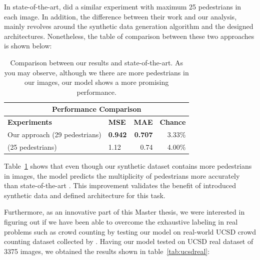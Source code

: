 \noindent In state-of-the-art, \citet{segui2015learning} did a similar experiment with maximum 25 pedestrians in each image. In addition, the difference between their work and our analysis, mainly revolves around the synthetic data generation algorithm and the designed architectures. Nonetheless, the table of comparison between these two approaches is shown below:
 
\begin{table}[H]
\centering
\small\sffamily
\begin{tabular}{llrr}
\multicolumn{4}{c}{\textbf{\textbf{Performance Comparison}}} \\
\bottomrule
\textbf{Experiments} &\textbf{MSE} &\textbf{MAE}& \textbf{Chance} \\
\bottomrule
Our approach (29 pedestrians)                  & \textbf{0.942}   &  \textbf{0.707}        & 3.33\% \\
\citet{segui2015learning} (25 pedestrians)     & 1.12       & 0.74     & 4.00\% \\
\bottomrule
\end{tabular}
\caption{Comparison between our results and state-of-the-art. As you may observe, although we there are more pedestrians in our images, our model shows a more promising performance.  }
\label{tab:tab}
\end{table} 

Table~\ref{tab:tab} shows that even though our synthetic dataset contains more pedestrians in images, the model predicts the multiplicity of pedestrians more accurately than state-of-the-art \cite{segui2015learning}. This improvement validates the benefit of introduced synthetic data and defined architecture for this task. 

\noindent Furthermore, as an innovative part of this Master thesis, we were interested in figuring out if we have been able to overcome the exhaustive labeling in real problems such as crowd counting by testing our model on real-world UCSD crowd counting dataset collected by \citet{chan2008privacy}. Having our model tested on UCSD real dataset of 3375 images, we obtained the results shown in table~\ref{tab:ucsdreal}:

%
%
%

